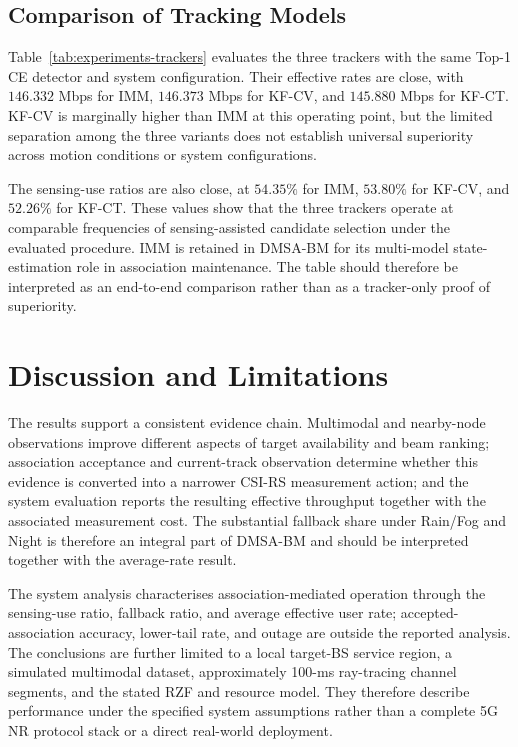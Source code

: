 \subsection{Comparison of Tracking Models}
\label{subsec:experiments-tracker-system}

Table~\ref{tab:experiments-trackers} evaluates the three trackers with the same
Top-1 CE detector and system configuration.  Their effective rates are close,
with \(146.332\) Mbps for IMM, \(146.373\) Mbps for KF-CV, and
\(145.880\) Mbps for KF-CT.  KF-CV is marginally higher than IMM at this
operating point, but the limited separation among the three variants does not
establish universal superiority across motion conditions or system
configurations.

The sensing-use ratios are also close, at \(54.35\%\) for IMM, \(53.80\%\) for
KF-CV, and \(52.26\%\) for KF-CT.  These values show that the three trackers
operate at comparable frequencies of sensing-assisted candidate selection under
the evaluated procedure.  IMM is retained in DMSA-BM for its
multi-model state-estimation role in association maintenance.  The table should
therefore be interpreted as an end-to-end comparison rather than as a
tracker-only proof of superiority.

\begin{table}[H]
    \centering
    \caption{Aggregate communication results for the tracker variants under
    the common detector and system configuration.}
    \label{tab:experiments-trackers}
    \small
    
\end{table}

\section{Discussion and Limitations}
\label{sec:experiments-discussion}

The results support a consistent evidence chain.  Multimodal and nearby-node
observations improve different aspects of target availability and beam ranking;
association acceptance and current-track observation determine whether this
evidence is converted into a narrower CSI-RS measurement action; and the system
evaluation reports the resulting effective throughput together with the
associated measurement cost.  The substantial fallback share under Rain/Fog
and Night is therefore an integral part of DMSA-BM and should be interpreted
together with the average-rate result.

The system analysis characterises association-mediated operation through the
sensing-use ratio, fallback ratio, and average effective user rate; accepted-association
accuracy, lower-tail rate, and outage are outside the reported analysis.  The
conclusions are further limited to a local target-BS service region, a simulated
multimodal dataset, approximately 100-ms ray-tracing channel segments, and the
stated RZF and resource model.  They therefore describe performance under the
specified system assumptions rather than a complete 5G NR protocol stack or a
direct real-world deployment.
